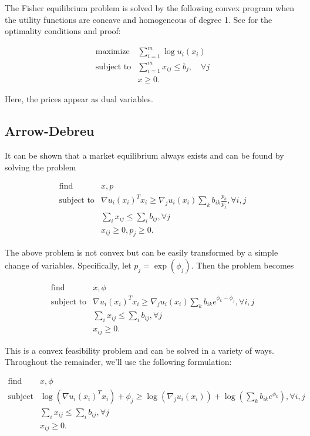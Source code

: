 \documentclass{article}
\begin{document}
The Fisher equilibrium problem is solved by the following convex program when the utility functions are concave and homogeneous of degree 1.
See \cite[Section~6.2]{nisan2007algorithmic} for the optimality conditions and proof:

\[
\begin{array}{ll}
\mbox{maximize} & \sum_{i=1}^m \log u_i(x_i) \\
\mbox{subject to} & \sum_{i=1}^m x_{ij} \leq b_j, \quad \forall j\\
& x \geq 0.
\end{array}
\]

Here, the prices appear as dual variables.

\subsection{Arrow-Debreu}
It can be shown that a market equilibrium always exists and can be found by solving the problem

\[
\begin{array}{ll}
\mbox{find} & x, p \\
\mbox{subject to} & \nabla u_i(x_i)^T x_i \geq  \nabla_j u_i(x_i) \sum_k b_{ik} \frac{p_k}{p_j}, \forall i,j\\
& \sum_i x_{ij} \leq \sum_i b_{ij}, \forall j\\
& x_{ij} \geq 0, p_j \geq 0.
\end{array}
\]


The above problem is not convex but can be easily transformed by a simple change of variables. Specifically, let $p_j = \exp(\phi_j)$.
Then the problem becomes

\[
\begin{array}{ll}
\mbox{find} & x, \phi \\
\mbox{subject to} & \nabla u_i(x_i)^T x_i \geq  \nabla_j u_i(x_i) \sum_k b_{ik} e^{\phi_k - \phi_j}, \forall i,j\\
& \sum_i x_{ij} \leq \sum_i b_{ij}, \forall j\\
& x_{ij} \geq 0.
\end{array}
\]

This is a convex feasibility problem and can be solved in a variety of ways.
Throughout the remainder, we'll use the following formulation:

\[
\begin{array}{ll}
\mbox{find} & x, \phi \\
\mbox{subject to} & \log(\nabla u_i(x_i)^T x_i) + \phi_j \geq  \log(\nabla_j u_i(x_i)) +  \log(\sum_k b_{ik} e^{\phi_k}), \forall i,j\\
& \sum_i x_{ij} \leq \sum_i b_{ij}, \forall j\\
& x_{ij} \geq 0.
\end{array}
\]
\end{document}
